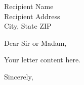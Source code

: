 \documentclass{letter}
\begin{document}
\begin{letter}{Recipient Name \\ Recipient Address \\ City, State ZIP}

\opening{Dear Sir or Madam,}

Your letter content here.

\closing{Sincerely,}

\end{letter}
\end{document}
